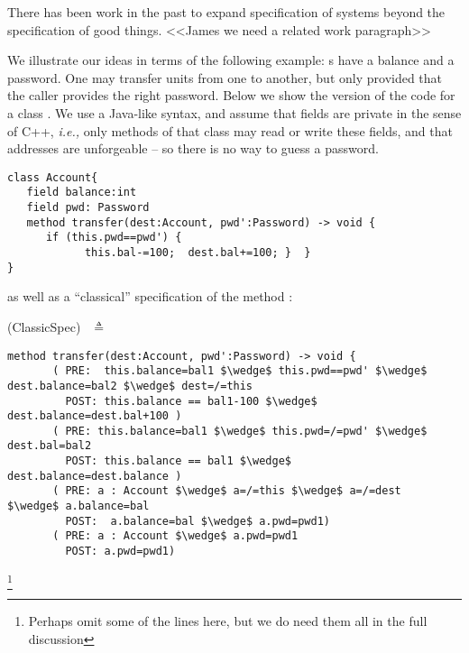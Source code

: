There has been work in the past to expand specification of systems beyond the specification of good things. <<James we need a related work paragraph>>

 
 
 We illustrate our ideas in terms of the following example:
 s have a balance and a 
password. One may transfer  units from one  to another, but only provided
that  the caller provides the right password. Below we show the version  of the code for 
a class . 
We use a Java-like syntax,  and assume that fields are private in the sense of C++, \emph{i.e.,}
 only methods of that class may read or write these fields,
 and   that addresses are unforgeable -- so  there is no way to guess a password.

 

\begin{lstlisting}
class Account{
   field balance:int 
   field pwd: Password 
   method transfer(dest:Account, pwd':Password) -> void {
      if (this.pwd==pwd') {
            this.bal-=100;  dest.bal+=100; }  }
}
\end{lstlisting}

as well as a ``classical'' specification of the method :

 (ClassicSpec)$  \ \ $  $\triangleq$

\begin{lstlisting}[mathescape=true, frame=lines]
  method transfer(dest:Account, pwd':Password) -> void {
       ( PRE:  this.balance=bal1 $\wedge$ this.pwd==pwd' $\wedge$ dest.balance=bal2 $\wedge$ dest=/=this 
         POST: this.balance == bal1-100 $\wedge$  dest.balance=dest.bal+100 )
       ( PRE: this.balance=bal1 $\wedge$ this.pwd=/=pwd' $\wedge$ dest.bal=bal2
         POST: this.balance == bal1 $\wedge$  dest.balance=dest.balance )
       ( PRE: a : Account $\wedge$ a=/=this $\wedge$ a=/=dest  $\wedge$ a.balance=bal  
         POST:  a.balance=bal $\wedge$ a.pwd=pwd1)
       ( PRE: a : Account $\wedge$ a.pwd=pwd1  
         POST: a.pwd=pwd1)       
\end{lstlisting}\footnote{Perhaps omit some of the lines here, but we do need them all in the full discussion}
 
